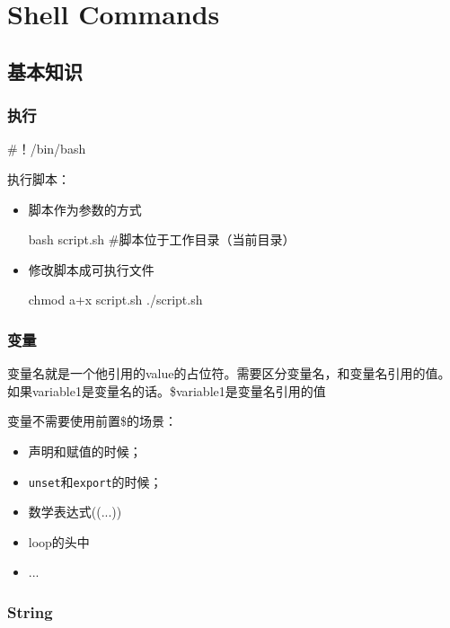 \chapter{Shell Commands}

\section{基本知识}

\subsection{执行}

\begin{Bash}[开头告诉shell使用什么bash]
#！/bin/bash
\end{Bash}


执行脚本：

\begin{itemize}
\item 脚本作为参数的方式
\begin{Bash}
bash script.sh   #脚本位于工作目录（当前目录）
\end{Bash}

\item 修改脚本成可执行文件

\begin{Bash}[内核会读取首行来确定执行的bash]
chmod a+x script.sh
./script.sh
\end{Bash}

\end{itemize}

\subsection{变量}

变量名就是一个他引用的value的占位符。需要区分变量名，和变量名引用的值。如果variable1是变量名的话。\$variable1是变量名引用的值

变量不需要使用前置\$的场景：
\begin{itemize}
\item 声明和赋值的时候；
\item \lstinline$unset$和\lstinline$export$的时候；
\item 数学表达式((...))
\item loop的头中
\item ...
\end{itemize}

\subsection{String}

